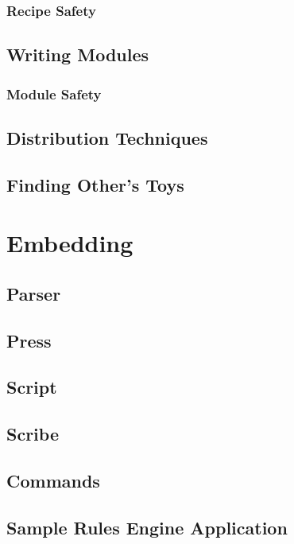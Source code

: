 \subsection{Recipe Safety}


\section{Writing Modules}


\subsection{Module Safety}


\section{Distribution Techniques}


\section{Finding Other's Toys}



\chapter{Embedding}
\label{chapter:Embedding}



\section{Parser}


\section{Press}


\section{Script}


\section{Scribe}


\section{Commands}


\section{Sample Rules Engine Application}


